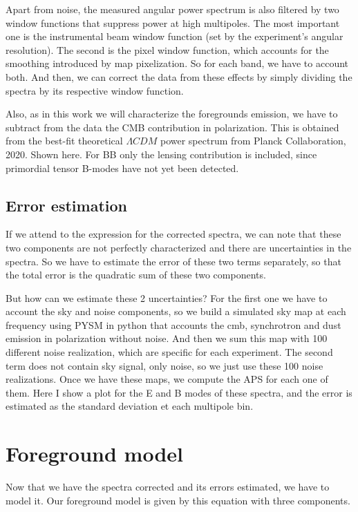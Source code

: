 \documentclass[12pt,a4paper]{article}
\begin{document}
Apart from noise, the measured angular power spectrum is also filtered by two window functions that suppress power at high multipoles. The most important one is the instrumental beam window function (set by the experiment's angular resolution). The second is the pixel window function, which accounts for the smoothing introduced by map pixelization. So for each band, we have to account both. And then, we can correct the data from these effects by simply dividing the spectra by its respective window function. 


Also, as in this work we will characterize the foregrounds emission, we have to subtract from the data the CMB contribution in polarization. This is obtained from the best-fit theoretical $\Lambda CDM$ power spectrum from Planck Collaboration, 2020. Shown here. For BB only the lensing contribution is included, since primordial tensor B-modes have not yet been detected.

\subsection{Error estimation}

If we attend to the expression for the corrected spectra, we can note that these two components are not perfectly characterized and there are uncertainties in the spectra. So we have to estimate the error of these two terms separately, so that the total error is the quadratic sum of these two components.

But how can we estimate these 2 uncertainties? For the first one we have to account the sky and noise components, so we build a simulated sky map at each frequency using PYSM in python that accounts the cmb, synchrotron and dust emission in polarization without noise. And then we sum this map with 100 different noise realization, which are specific for each experiment. The second term does not contain sky signal, only noise, so we just use these 100 noise realizations. Once we have these maps, we compute the APS for each one of them. Here I show a plot for the E and B modes of these spectra, and the error is estimated as the standard deviation et each multipole bin. 


\section*{Foreground model}

Now that we have the spectra corrected and its errors estimated, we have to model it. Our foreground model is given by this equation with three components.
\end{document}

